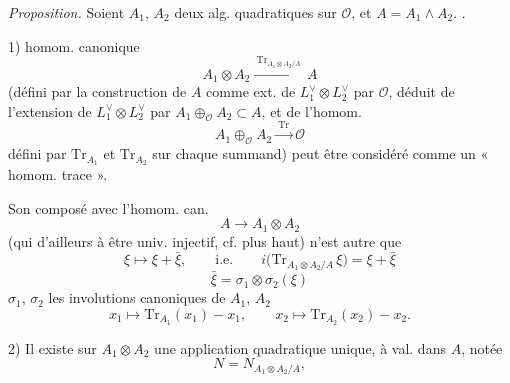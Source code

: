 \documentclass[11pt,a4paper]{article}
\begin{document}
\emph{Proposition.} Soient $A_1$, $A_2$ deux alg. quadratiques sur $\mathcal{O}$, et $A = A_1 \wedge A_2$. .

1) \struck{\ill{}} homom. canonique
\[
  A_1 \otimes A_2 \xrightarrow{\ \mathrm{Tr}_{A_1 \otimes A_2 / A}\ } A
\]
(défini par la construction de $A$ comme ext. de $L_1^{\vee} \otimes L_2^{\vee}$ par $\mathcal{O}$, déduit de l'extension  de $L_1^{\vee} \otimes L_2^{\vee}$ par $A_1 \oplus_{\mathcal{O}} A_2 \subset A$, et de l'homom.
\[
  A_1 \oplus_{\mathcal{O}} A_2 \xrightarrow{\ \mathrm{Tr}\ } \mathcal{O}
\]
défini par $\mathrm{Tr}_{A_1}$ et $\mathrm{Tr}_{A_2}$ sur chaque summand) peut être considéré comme un « homom. trace ».


Son composé avec l'homom. can.
\[
  A \to A_1 \otimes A_2
\]
(qui d'ailleurs   à être univ. injectif, cf. plus haut) \struck{\ill{}} n'est autre que
\[
  \xi \mapsto \xi + \bar{\xi} , \qquad \text{i.e.} \qquad
  i\bigl(\mathrm{Tr}_{A_1 \otimes A_2 / A}\, \xi\bigr) = \xi + \bar{\xi}
\]
\[
  \bar{\xi} = \sigma_1 \otimes \sigma_2 (\xi)
\]
$\sigma_1$, $\sigma_2$ les involutions canoniques de $A_1$, $A_2$
\[
  x_1 \mapsto \mathrm{Tr}_{A_1}(x_1) - x_1 , \qquad x_2 \mapsto \mathrm{Tr}_{A_2}(x_2) - x_2 .
\]

2) Il existe sur $A_1 \otimes A_2$ une application quadratique unique, à val. dans $A$, notée
\[
  N = N_{A_1 \otimes A_2 / A} ,
\]
\end{document}
